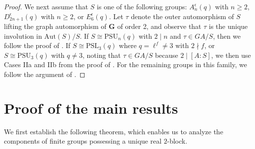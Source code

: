 \documentclass[10pt]{article}
\begin{document}
\begin{proof}
 


We next assume that $S$ is one of the following groups: $A_n^\epsilon(q) $ with $ n\geq 2$, $D_{2n+1}^\epsilon(q)$ with $n\geq 2$, or $E_6^{\epsilon}(q)$.
Let $\tau$ denote the outer automorphism of $S$ lifting the graph automorphism of $\mathbf{G}$ of order 2,
and observe that $\tau$ is the unique involution in $\mathrm{Aut}(S)/S$.
If $S\cong\mathrm{PSU}_n(q)$ with $2\mid n$ and $\tau\in GA/S$,
then we follow the proof of \cite[Proposition 6.3]{tiep15}.
If $S\cong \mathrm{PSL}_3(q)$ where $q=\ell^f\neq 3$ with $2\nmid f$, or $S\cong \mathrm{PSU}_3(q)$ with $q\neq 3$,
noting that $\tau\in GA/S$ because $2\mid [A:S]$,
we then use Cases IIa and IIb from the proof of \cite[Proposition 4.7]{marinelli13}.
For the remaining groups in this family, 
we follow the argument of \cite[Proposition 4.7]{marinelli13}.
\end{proof}



\section{Proof of the main results}


We first establish the following theorem, which enables us to analyze the components of finite groups possessing a unique real $2$-block.
\end{document}
